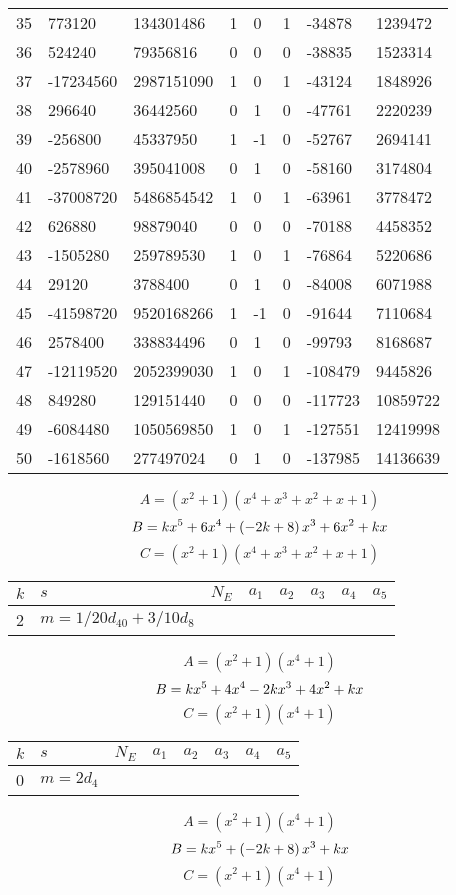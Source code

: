 \documentclass{amsart}
\begin{document}
\begin{longtable}{|l|l|l|lllll|}
35&773120&134301486&1&0&1&-34878&1239472\\
36&524240&79356816&0&0&0&-38835&1523314\\
37&-17234560&2987151090&1&0&1&-43124&1848926\\
38&296640&36442560&0&1&0&-47761&2220239\\
39&-256800&45337950&1&-1&0&-52767&2694141\\
40&-2578960&395041008&0&1&0&-58160&3174804\\
41&-37008720&5486854542&1&0&1&-63961&3778472\\
42&626880&98879040&0&0&0&-70188&4458352\\
43&-1505280&259789530&1&0&1&-76864&5220686\\
44&29120&3788400&0&1&0&-84008&6071988\\
45&-41598720&9520168266&1&-1&0&-91644&7110684\\
46&2578400&338834496&0&1&0&-99793&8168687\\
47&-12119520&2052399030&1&0&1&-108479&9445826\\
48&849280&129151440&0&0&0&-117723&10859722\\
49&-6084480&1050569850&1&0&1&-127551&12419998\\
50&-1618560&277497024&0&1&0&-137985&14136639\\
\hline
\end{longtable}
$$A=(x^2
 + 1)(x^4
 + x^3
 + x^2
 + x
 + 1)$$
$$B=k\*x^5
 + 6\*x^4
 + \left(-2\*k
 + 8\right) \*x^3
 + 6\*x^2
 + k\*x$$
$$C=(x^2
 + 1)(x^4
 + x^3
 + x^2
 + x
 + 1)$$
\begin{longtable}{|l|l|l|lllll|}
\hline
$k$ & $s$ & $N_E$ & $a_1$ & $a_2$ & $a_3$ & $a_4$ & $a_5$\\
\hline
2&$m=1/20d_{40}+3/10d_{8}$&&\multicolumn{5}{c|}{}\\
\hline
\end{longtable}
$$A=(x^2
 + 1)(x^4
 + 1)$$
$$B=k\*x^5
 + 4\*x^4
 - 2\*k\*x^3
 + 4\*x^2
 + k\*x$$
$$C=(x^2
 + 1)(x^4
 + 1)$$
\begin{longtable}{|l|l|l|lllll|}
\hline
$k$ & $s$ & $N_E$ & $a_1$ & $a_2$ & $a_3$ & $a_4$ & $a_5$\\
\hline
0&$m=2d_{4}$&&\multicolumn{5}{c|}{}\\
\hline
\end{longtable}
$$A=(x^2
 + 1)(x^4
 + 1)$$
$$B=k\*x^5
 + \left(-2\*k
 + 8\right) \*x^3
 + k\*x$$
$$C=(x^2
 + 1)(x^4
 + 1)$$
\end{document}
